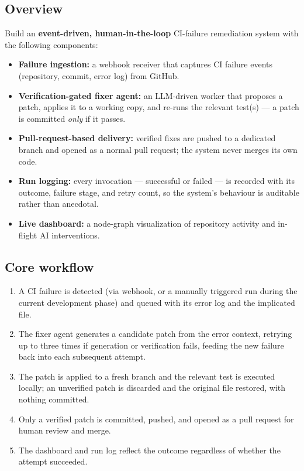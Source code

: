 \documentclass[11pt,a4paper]{article}
\begin{document}
\subsection{Overview}
Build an \textbf{event-driven, human-in-the-loop} CI-failure
remediation system with the following components:
\begin{itemize}[leftmargin=0.7cm]
    \item \textbf{Failure ingestion:} a webhook receiver that
      captures CI failure events (repository, commit, error log)
      from GitHub.
    \item \textbf{Verification-gated fixer agent:} an LLM-driven
      worker that proposes a patch, applies it to a working copy,
      and re-runs the relevant test(s) --- a patch is committed
      \emph{only} if it passes.
    \item \textbf{Pull-request-based delivery:} verified fixes are
      pushed to a dedicated branch and opened as a normal pull
      request; the system never merges its own code.
    \item \textbf{Run logging:} every invocation --- successful or
      failed --- is recorded with its outcome, failure stage, and
      retry count, so the system's behaviour is auditable rather
      than anecdotal.
    \item \textbf{Live dashboard:} a node-graph visualization of
      repository activity and in-flight AI interventions.
\end{itemize}

\subsection{Core workflow}
\begin{enumerate}[leftmargin=0.7cm]
    \item A CI failure is detected (via webhook, or a manually
      triggered run during the current development phase) and
      queued with its error log and the implicated file.
    \item The fixer agent generates a candidate patch from the error
      context, retrying up to three times if generation or
      verification fails, feeding the new failure back into each
      subsequent attempt.
    \item The patch is applied to a fresh branch and the relevant
      test is executed locally; an unverified patch is discarded and
      the original file restored, with nothing committed.
    \item Only a verified patch is committed, pushed, and opened as
      a pull request for human review and merge.
    \item The dashboard and run log reflect the outcome regardless
      of whether the attempt succeeded.
\end{enumerate}
\end{document}
